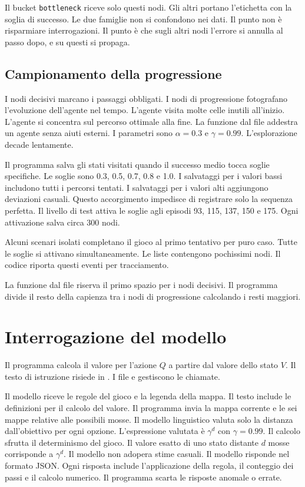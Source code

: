 \documentclass[12pt,a4paper]{article}
\begin{document}
Il bucket \texttt{bottleneck} riceve solo questi nodi. Gli altri portano l'etichetta  con la soglia di successo. Le due famiglie non si confondono nei dati. Il punto non \`e risparmiare interrogazioni. Il punto \`e che sugli altri nodi l'errore si annulla al passo dopo, e su questi si propaga.

\subsection{Campionamento della progressione}\label{subsec:checkpoint}
I nodi decisivi marcano i passaggi obbligati. I nodi di progressione fotografano l'evoluzione dell'agente nel tempo. L'agente visita molte celle inutili all'inizio. L'agente si concentra sul percorso ottimale alla fine. La funzione  dal file  addestra un agente senza aiuti esterni. I parametri sono $\alpha=0.3$ e $\gamma=0.99$. L'esplorazione decade lentamente.

Il programma salva gli stati visitati quando il successo medio tocca soglie specifiche. Le soglie sono 0.3, 0.5, 0.7, 0.8 e 1.0. I salvataggi per i valori bassi includono tutti i percorsi tentati. I salvataggi per i valori alti aggiungono deviazioni casuali. Questo accorgimento impedisce di registrare solo la sequenza perfetta. Il livello di test attiva le soglie agli episodi 93, 115, 137, 150 e 175. Ogni attivazione salva circa 300 nodi.

Alcuni scenari isolati completano il gioco al primo tentativo per puro caso. Tutte le soglie si attivano simultaneamente. Le liste contengono pochissimi nodi. Il codice riporta questi eventi per tracciamento.

La funzione  dal file  riserva il primo spazio per i nodi decisivi. Il programma divide il resto della capienza tra i nodi di progressione calcolando i resti maggiori.

\section{Interrogazione del modello}\label{sec:prompt}
Il programma calcola il valore per l'azione $Q$ a partire dal valore dello stato $V$. Il testo di istruzione risiede in . I file  e  gestiscono le chiamate.

Il modello riceve le regole del gioco e la legenda della mappa. Il testo include le definizioni per il calcolo del valore. Il programma invia la mappa corrente e le sei mappe relative alle possibili mosse. Il modello linguistico valuta solo la distanza dall'obiettivo per ogni opzione. L'espressione valutata \`e $\gamma^d$ con $\gamma=0.99$. Il calcolo sfrutta il determinismo del gioco. Il valore esatto di uno stato distante $d$ mosse corrisponde a $\gamma^d$. Il modello non adopera stime casuali. Il modello risponde nel formato JSON. Ogni risposta include l'applicazione della regola, il conteggio dei passi e il calcolo numerico. Il programma scarta le risposte anomale o errate.
\end{document}

